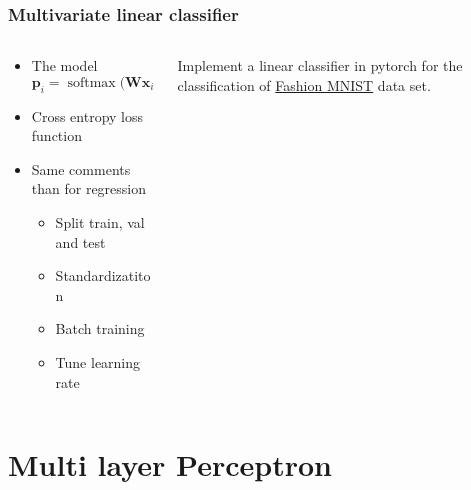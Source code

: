 \documentclass[pressentation,10pt,aspectratio=169,xcolor=table, colorlinks=true]{beamer}
\DeclareMathOperator{\softmax}{softmax}
\begin{document}
\begin{frame}
  \frametitle{Multivariate linear classifier}
  \begin{columns}
    \begin{column}{0.5\linewidth}
      \begin{itemize}
      \item The model
        \[\mathbf{p}_i = \softmax\Big(\mathbf{W}\mathbf{x}_i + \mathbf{b}\Big)\]
      \item Cross entropy loss function
      \item Same comments than for regression
        \begin{itemize}
        \item Split train, val and test
        \item Standardizatiton
        \item Batch training
        \item Tune learning rate
        \end{itemize}
      \end{itemize}
    \end{column}
    \begin{column}{0.5\linewidth}
      \begin{work}
        Implement a linear classifier in pytorch for the classification of \href{https://github.com/zalandoresearch/fashion-mnist}{Fashion MNIST} data set.        
      \end{work}
      
    \end{column}
  \end{columns}
\end{frame}


\section{Multi layer Perceptron}
\end{document}
